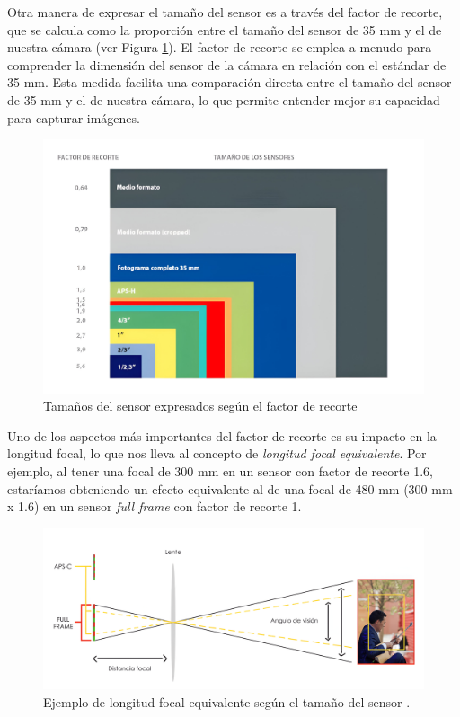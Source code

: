 Otra manera de expresar el tamaño del sensor es a través del factor de recorte, que se calcula como la proporción entre el tamaño del sensor de 35 mm y el de nuestra cámara (ver Figura \ref{fig12}). El factor de recorte se emplea a menudo para comprender la dimensión del sensor de la cámara en relación con el estándar de 35 mm. Esta medida facilita una comparación directa entre el tamaño del sensor de 35 mm y el de nuestra cámara, lo que permite entender mejor su capacidad para capturar imágenes.

\begin{figure}[h]
	\centering
	\includegraphics[scale=0.08]{imagenes/cap2/tam_sensor_factor.jpeg}
	\caption[Tipos de tamaños de sensor.]{Tamaños del sensor expresados según el factor de recorte \cite{48}}
	\label{fig12}
\end{figure}

Uno de los aspectos más importantes del factor de recorte es su impacto en la longitud focal, lo que nos lleva al concepto de \textit{longitud focal equivalente}. Por ejemplo, al tener una focal de 300 mm en un sensor con factor de recorte 1.6, estaríamos obteniendo un efecto equivalente al de una focal de 480 mm (300 mm x 1.6) en un sensor \textit{full frame} con factor de recorte 1.

\begin{figure}[h]
	\centering
	\includegraphics[scale=0.13]{imagenes/cap2/focal-equivalente.png}
	\caption[Ejemplo de longitud focal equivalente.]{Ejemplo de longitud focal equivalente según el tamaño del sensor \cite{46}.}
	\label{fig13}
\end{figure}


